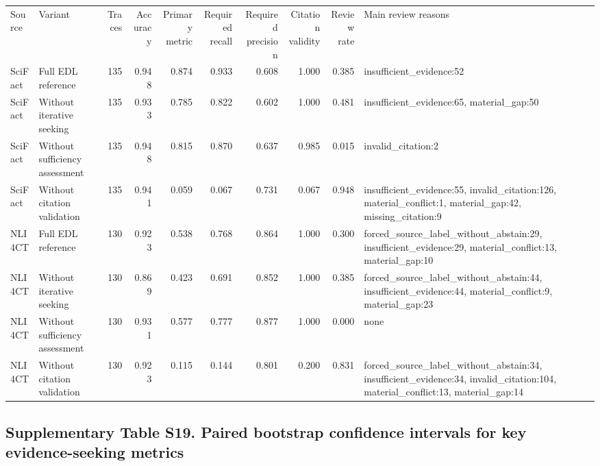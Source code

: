 \documentclass[
  8pt,
]{extarticle}
\begin{document}
\begin{center}
\begin{adjustbox}{max width=0.95\textwidth}
\begin{tabular}{@{}
llrrrrrrrl@{}}
\toprule\noalign{}
Source & Variant & Traces & Accuracy & Primary metric & Required recall
& Required precision & Citation validity & Review rate & Main review
reasons \\

SciFact & Full EDL reference & 135 & 0.948 & 0.874 & 0.933 & 0.608 & 1.000 & 0.385
& insufficient\_evidence:52 \\
SciFact & Without iterative seeking & 135 & 0.933 & 0.785 & 0.822 &
0.602 & 1.000 & 0.481 & insufficient\_evidence:65,
material\_gap:50 \\
SciFact & Without sufficiency assessment & 135 & 0.948 & 0.815 & 0.870 &
0.637 & 0.985 & 0.015 & invalid\_citation:2 \\
SciFact & Without citation validation & 135 & 0.941 & 0.059 & 0.067 &
0.731 & 0.067 & 0.948 & insufficient\_evidence:55,
invalid\_citation:126, material\_conflict:1, material\_gap:42,
missing\_citation:9 \\
NLI4CT & Full EDL reference & 130 & 0.923 & 0.538 & 0.768 & 0.864 & 1.000 & 0.300
& forced\_source\_label\_without\_abstain:29, insufficient\_evidence:29,
material\_conflict:13, material\_gap:10 \\
NLI4CT & Without iterative seeking & 130 & 0.869 & 0.423 & 0.691 & 0.852
& 1.000 & 0.385 & forced\_source\_label\_without\_abstain:44,
insufficient\_evidence:44, material\_conflict:9, material\_gap:23 \\
NLI4CT & Without sufficiency assessment & 130 & 0.931 & 0.577 & 0.777 &
0.877 & 1.000 & 0.000 & none \\
NLI4CT & Without citation validation & 130 & 0.923 & 0.115 & 0.144 &
0.801 & 0.200 & 0.831 & forced\_source\_label\_without\_abstain:34,
insufficient\_evidence:34, invalid\_citation:104, material\_conflict:13,
material\_gap:14 \\
\bottomrule
\end{tabular}
\end{adjustbox}
\end{center}

\hypertarget{supplementary-table-s19-paired-bootstrap-confidence-intervals-for-key-evidence-seeking-metrics}{%
\subsection{Supplementary Table S19. Paired bootstrap confidence
intervals for key evidence-seeking
metrics}\label{supplementary-table-s19-paired-bootstrap-confidence-intervals-for-key-evidence-seeking-metrics}}
\end{document}
